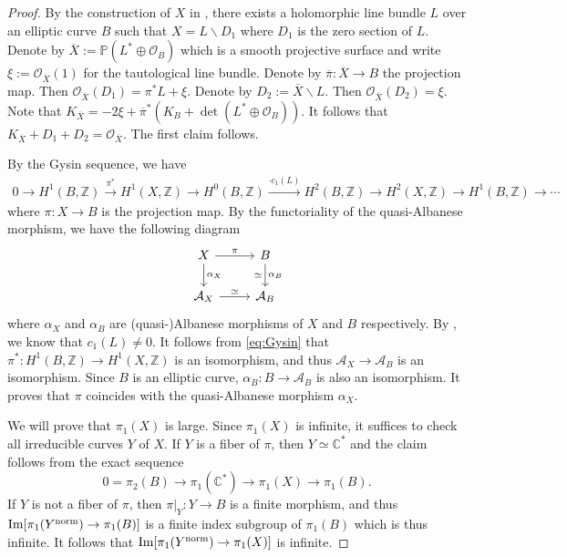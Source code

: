 \documentclass[11pt,english]{smfart}
\theoremstyle{plain}
\theoremstyle{definition}
\theoremstyle{remark}
\numberwithin{equation}{subsection}
\theoremstyle{plain}
\newcommand{\cA}{\mathcal A}
\newcommand{\cO}{\mathcal O}
\newcommand{\bC}{\mathbb{C}}
\newcommand{\bP}{\mathbb{P}}
\newcommand{\bZ}{\mathbb{Z}}
\begin{document}
\begin{proof}
	By the construction of $X$ in , there exists a holomorphic line bundle $L$ over an elliptic curve $B$  such that $X=L\backslash D_1$ where $D_1$ is the zero section of $L$.  Denote by $\overline{X}:=\bP(L^*\oplus \cO_B)$ which is a smooth projective surface and write $\xi:=\cO_{\overline{X}}(1)$ for the tautological line bundle. Denote by  $\overline{\pi}:\overline{X}\to B$   the projection map.  Then   $\cO_{\overline{X}}(D_1)=\pi^*L+ \xi$.   Denote by $D_2:=\overline{X}\backslash L$. Then   $\cO_{\overline{X}}(D_2)=\xi$.   Note that $K_{\overline{X}}=-2\xi+\overline{\pi}^*(K_B+\det (L^*\oplus \cO_B))$. 	It follows that $K_{\overline{X}}+D_1+D_2=\cO_{\overline{X}}$. The first claim follows.

    By the Gysin sequence, we have 
    \begin{align}\label{eq:Gysin}
    	0\to H^1(B,\bZ)\stackrel{\pi^*}{\to} H^1(X,\bZ)\to H^0(B,\bZ)\stackrel{\cdot c_1(L)}{\to} H^2(B,\bZ)\to H^2(X,\bZ)\to H^1(B,\bZ)\to\cdots
    \end{align}   
    where $\pi:X\to B$ is the projection map.    By the functoriality of the quasi-Albanese morphism, we have the following diagram
\begin{equation*}
	\begin{tikzcd}
		X \arrow[r,"\pi"]\arrow[d,"\alpha_X"] & B\arrow[d,"\alpha_B","\simeq"']\\
		\cA_X\arrow[r,"\simeq"] & \cA_{B}
	\end{tikzcd}
\end{equation*}
where $\alpha_X$ and $\alpha_B$ are (quasi-)Albanese morphisms of $X$ and $B$ respectively.     By , we know that $c_1(L)\neq 0$.
It follows from \eqref{eq:Gysin} that $\pi^*:H^1(B,\bZ)\to H^1(X,\bZ)$ is an isomorphism, and thus $\cA_X\to \cA_B$ is an isomorphism.   Since $B$ is an elliptic curve, $\alpha_B:B\to \cA_B$ is also an isomorphism. It proves that $\pi$ coincides with the quasi-Albanese morphism   $\alpha_X$. 

We will prove that $\pi_1(X)$ is large. Since $\pi_1(X)$ is infinite, it suffices to check all irreducible curves $Y$ of $X$.    If $Y$ is a fiber of $\pi$, then $Y\simeq \bC^*$ and the claim follows from the exact sequence
$$
0=\pi_2(B)\to \pi_1(\bC^*)\to \pi_1(X)\to \pi_1(B).
$$   
If $Y$ is not a fiber of $\pi$, then $\pi|_{Y}:Y\to B$ is a  finite morphism, and thus   ${\rm Im}[\pi_1(Y^{\rm norm})\to \pi_1(B)]$ is a finite index subgroup of $\pi_1(B)$ which is thus infinite. It follows that   ${\rm Im}[\pi_1(Y^{\rm norm})\to \pi_1(X)]$ is infinite. 


\end{proof}
\end{document}
